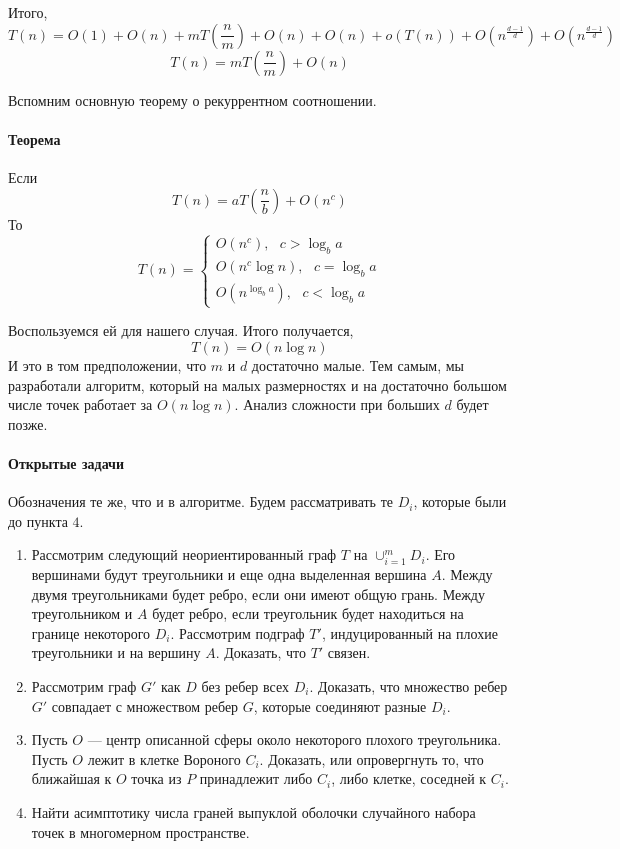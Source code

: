 \documentclass{article}
\begin{document}
    Итого, 
    $$
        T(n) = O(1) + O(n) + m T\left( \frac{n}{m}  \right) + O(n) + O(n) +o(T(n)) + O(n^\frac{d - 1}{d}) + O(n^\frac{d - 1}{d})
    $$    
    $$
        T(n) = m T \left( \frac{n}{m} \right) + O(n)
    $$
	
	Вспомним основную теорему о рекуррентном соотношении.
	
	\paragraph{Теорема\\}
	    Если 
	    $$
	        T(n) = a T \left( \frac{n}{b} \right) + O(n^c)
	    $$
	    То
	    $$
	        T(n) = \left\{
            	    \begin{array}{c}
				    O(n^c), ~~~ c > \log_b a    \\
				    O(n^c \log n), ~~~ c = \log_b a    \\
				    O(n^{\log_b a}), ~~~ c < \log_b a
			    \end{array}
		    \right.		
	    $$
	    
	Воспользуемся ей для нашего случая. Итого получается, 
	$$
	    T(n) = O(n \log n)	
    $$
    И это в том предположении, что $m$ и $d$ достаточно малые. Тем самым, мы разработали алгоритм, который на малых размерностях и на достаточно большом числе точек работает за $O(n \log n)$. Анализ сложности при больших $d$ будет позже. 
    
    \paragraph{Открытые задачи\\}
        Обозначения те же, что и в алгоритме. Будем рассматривать те $D_i$, которые были до пункта $4$.
        \begin{enumerate}
            \item Рассмотрим следующий неориентированный граф $T$ на $\cup_{i = 1}^m D_i$. Его вершинами будут треугольники и еще одна выделенная вершина $A$. Между двумя треугольниками будет ребро, если они имеют общую грань. Между треугольником и $A$ будет ребро, если треугольник будет находиться на границе некоторого $D_i$. Рассмотрим подграф $T'$, индуцированный на плохие треугольники и на вершину $A$. Доказать, что $T'$ связен.
            \item Рассмотрим граф $G'$ как $D$ без ребер всех $D_i$. Доказать, что множество ребер $G'$ совпадает с множеством ребер $G$, которые соединяют разные $D_i$. 
            \item Пусть $O$ --- центр описанной сферы около некоторого плохого треугольника. Пусть $O$ лежит в клетке Вороного $C_i$. Доказать, или опровергнуть то, что ближайшая к $O$ точка из $P$ принадлежит либо $C_i$, либо клетке, соседней к $C_i$.  
            \item Найти асимптотику числа граней выпуклой оболочки случайного набора точек в многомерном пространстве.             
            
        \end{enumerate}           
    
        
    
	
\end{document}
